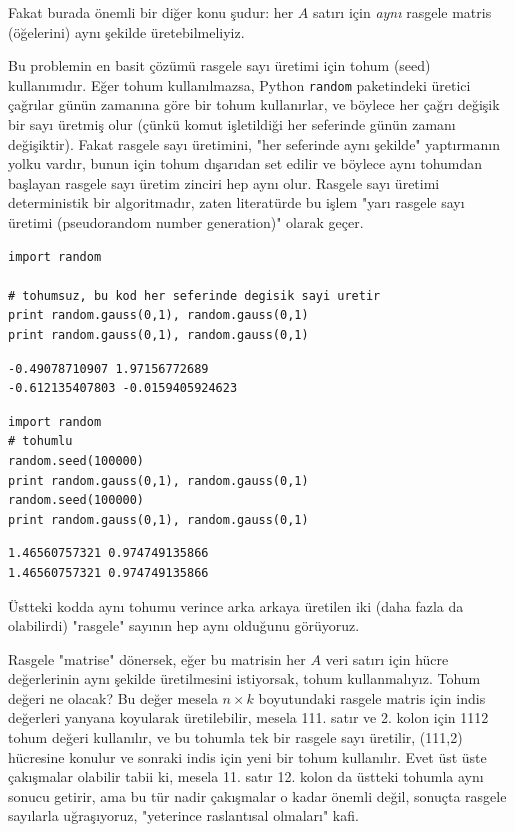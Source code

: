 \documentclass[12pt,fleqn]{article}\usepackage{../../common}
\begin{document}
Fakat burada önemli bir diğer konu şudur: her $A$ satırı için {\em aynı}
rasgele matris (öğelerini) aynı şekilde üretebilmeliyiz.

Bu problemin en basit çözümü rasgele sayı üretimi için tohum (seed)
kullanımıdır. Eğer tohum kullanılmazsa, Python \verb!random!
paketindeki üretici çağrılar günün zamanına göre bir tohum
kullanırlar, ve böylece her çağrı değişik bir sayı üretmiş olur (çünkü
komut işletildiği her seferinde günün zamanı değişiktir). Fakat
rasgele sayı üretimini, "her seferinde aynı şekilde" yaptırmanın yolku
vardır, bunun için tohum dışarıdan set edilir ve böylece aynı tohumdan
başlayan rasgele sayı üretim zinciri hep aynı olur. Rasgele sayı
üretimi deterministik bir algoritmadır, zaten literatürde bu işlem
"yarı rasgele sayı üretimi (pseudorandom number generation)" olarak
geçer.

\begin{verbatim}
import random

# tohumsuz, bu kod her seferinde degisik sayi uretir
print random.gauss(0,1), random.gauss(0,1)
print random.gauss(0,1), random.gauss(0,1)
\end{verbatim}

\begin{verbatim}
-0.49078710907 1.97156772689
-0.612135407803 -0.0159405924623
\end{verbatim}

\begin{verbatim}
import random
# tohumlu
random.seed(100000)
print random.gauss(0,1), random.gauss(0,1)
random.seed(100000)
print random.gauss(0,1), random.gauss(0,1)
\end{verbatim}

\begin{verbatim}
1.46560757321 0.974749135866
1.46560757321 0.974749135866
\end{verbatim}

Üstteki kodda aynı tohumu verince arka arkaya üretilen iki (daha fazla
da olabilirdi) "rasgele" sayının hep aynı olduğunu görüyoruz.

Rasgele "matrise" dönersek, eğer bu matrisin her $A$ veri satırı için
hücre değerlerinin aynı şekilde üretilmesini istiyorsak, tohum
kullanmalıyız. Tohum değeri ne olacak? Bu değer mesela $n \times k$
boyutundaki rasgele matris için indis değerleri yanyana koyularak
üretilebilir, mesela 111. satır ve 2. kolon için 1112 tohum değeri
kullanılır, ve bu tohumla tek bir rasgele sayı üretilir, (111,2)
hücresine konulur ve sonraki indis için yeni bir tohum
kullanılır. Evet üst üste çakışmalar olabilir tabii ki, mesela
11. satır 12. kolon da üstteki tohumla aynı sonucu getirir, ama bu tür
nadir çakışmalar o kadar önemli değil, sonuçta rasgele sayılarla
uğraşıyoruz, "yeterince raslantısal olmaları" kafi.
\end{document}
